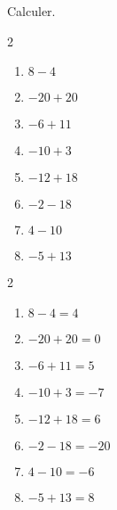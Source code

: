 \begin{exercice*}
    Calculer.
    \begin{multicols}2
        \begin{enumerate}
            \item $ 8-4 $
            \item $ -20+20 $
            \item $ -6+11 $
            \item $ -10+3 $
            \item $ -12+18 $
            \item $ -2-18 $
            \item $ 4-10 $
            \item $ -5+13 $
        \end{enumerate}
    \end{multicols}

\end{exercice*}
\begin{corrige}
    \phantom{rrr}    
    \begin{multicols}2
        \begin{enumerate}
            \item $ 8-4 = 4 $
            \item $ -20+20 = 0 $
            \item $ -6+11 = 5 $
            \item $ -10+3 = -7 $
            \item $ -12+18 = 6 $
            \item $ -2-18 = -20 $
            \item $ 4-10 = -6 $
            \item $ -5+13 = 8 $
        \end{enumerate}
    \end{multicols}
\end{corrige}
